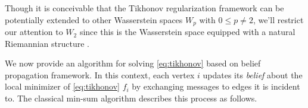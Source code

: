 \documentclass[letterpaper]{article} %
\begin{document}
\begin{remark}
  Though it is conceivable that the Tikhonov regularization framework can be potentially extended to other Wasserstein spaces $W_p$ with $0\leq p\neq 2$, we'll restrict our attention to $W_2$ since this is the Wasserstein space equipped with a natural Riemannian structure \cite{Otto2001,AGS2008,LottVillani2009}.
\end{remark}
We now provide an algorithm for solving \eqref{eq:tikhonov} based on belief propagation framework. In this context, each vertex $i$ updates its \textit{belief} about the local minimizer of \eqref{eq:tikhonov} $f_i$ by exchanging messages to edges it is incident to. 
The classical min-sum algorithm \cite{min_Sum} describes this process as follows. 
\end{document}
